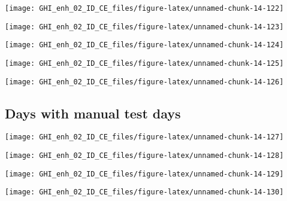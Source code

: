 \documentclass[
  10pt,
  a4paper,oneside]{article}
\begin{document}
\begin{center}\texttt{[image: GHI\_enh\_02\_ID\_CE\_files/figure-latex/unnamed-chunk-14-122]} \end{center}

\begin{center}\texttt{[image: GHI\_enh\_02\_ID\_CE\_files/figure-latex/unnamed-chunk-14-123]} \end{center}

\begin{center}\texttt{[image: GHI\_enh\_02\_ID\_CE\_files/figure-latex/unnamed-chunk-14-124]} \end{center}

\begin{center}\texttt{[image: GHI\_enh\_02\_ID\_CE\_files/figure-latex/unnamed-chunk-14-125]} \end{center}

\begin{center}\texttt{[image: GHI\_enh\_02\_ID\_CE\_files/figure-latex/unnamed-chunk-14-126]} \end{center}

\FloatBarrier

\hypertarget{days-with-manual-test-days}{%
\subsection{Days with manual test days}\label{days-with-manual-test-days}}

\begin{center}\texttt{[image: GHI\_enh\_02\_ID\_CE\_files/figure-latex/unnamed-chunk-14-127]} \end{center}

\begin{center}\texttt{[image: GHI\_enh\_02\_ID\_CE\_files/figure-latex/unnamed-chunk-14-128]} \end{center}

\begin{center}\texttt{[image: GHI\_enh\_02\_ID\_CE\_files/figure-latex/unnamed-chunk-14-129]} \end{center}

\begin{center}\texttt{[image: GHI\_enh\_02\_ID\_CE\_files/figure-latex/unnamed-chunk-14-130]} \end{center}

\newpage
\FloatBarrier
\end{document}
